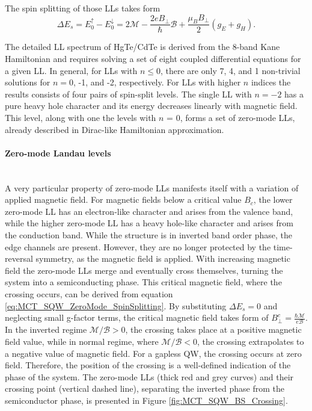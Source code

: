 \documentclass[titlepage,a4paper]{book}
\newcommand{\wciecie}{\quad\phantom{v}}
\newcommand{\myparagraph}[1]{\paragraph{#1}\mbox{}\\}
\begin{document}
The spin splitting of those LLs takes form
\begin{equation}
\label{eq:MCT_SQW_ZeroMode_SpinSplitting}
\Delta E_s = E^{\uparrow}_0 - E^{\downarrow}_0 = 2\mathcal{M} -\frac{2eB_{\perp}}{\hbar}\mathcal{B}+\frac{\mu_B B_{\perp}}{2}(g_E + g_H). 
\end{equation}

The detailed LL spectrum of HgTe/CdTe is derived from the 8-band Kane Hamiltonian and requires solving a set of eight coupled differential equations for a given LL. In general, for LLs with $n \leq 0$, there are only 7, 4, and 1 non-trivial solutions for $n = 0$, -1, and -2, respectively. For LLs with higher $n$ indices the results consists of four pairs of spin-split levels. The single LL with $n = -2$ has a pure heavy hole character and its energy decreases linearly with magnetic field. This level, along with one the levels with $n$ = 0, forms a set of zero-mode LLs, already described in Dirac-like Hamiltonian approximation.

\myparagraph{Zero-mode Landau levels}
\wciecie
A very particular property of zero-mode LLs manifests itself with a variation of applied magnetic field. For magnetic fields below a critical value $B_c$, the lower zero-mode LL has an electron-like character and arises from the valence band, while the higher zero-mode LL has a heavy hole-like character and arises from the conduction band. While the structure is in inverted band order phase, the edge channels are present. However, they are no longer protected by the time-reversal symmetry, as the magnetic field is applied. With increasing magnetic field the zero-mode LLs merge and eventually cross themselves, turning the system into a semiconducting phase. This critical magnetic field, where the crossing occurs, can be derived from equation \ref{eq:MCT_SQW_ZeroMode_SpinSplitting}. By substituting $\Delta E_s = 0$ and neglecting small g-factor terms, the critical magnetic field takes form of $B^c_{\perp} = \frac{\hbar \mathcal{M}}{e\mathcal{B}}$. In the inverted regime $\mathcal{M}/\mathcal{B} > 0$, the crossing takes place at a positive magnetic field value, while in normal regime, where $\mathcal{M}/\mathcal{B} < 0$, the crossing extrapolates to a negative value of magnetic field. For a gapless QW, the crossing occurs at zero field. Therefore, the position of the crossing is a well-defined indication of the phase of the system. The zero-mode LLs (thick red and grey curves) and their crossing point (vertical dashed line), separating the inverted phase from the semiconductor phase, is presented in Figure \ref{fig:MCT_SQW_BS_Crossing}. 
\end{document}
